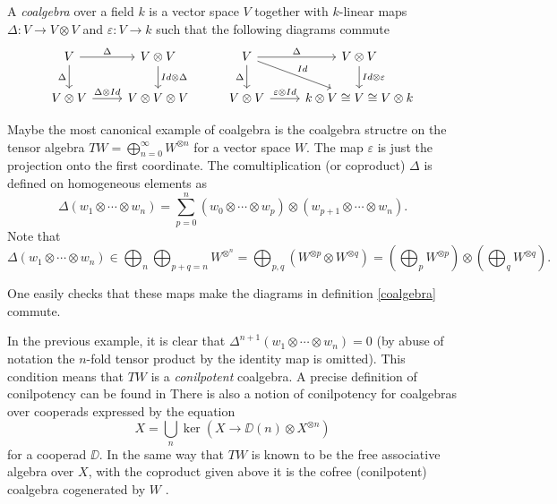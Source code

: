 \documentclass[TFM.tex]{subfiles}
\begin{document}
\begin{defi}\label{coalgebra}
A \emph{coalgebra} over a field $k$ is a vector space $V$ together with $k$-linear maps $\Delta:V\to V\otimes V$ and $\varepsilon:V\to k$ such that the following diagrams commute
\[
\begin{tikzcd}
V \arrow[r, "\Delta"] \arrow[d, "\Delta"'] & V\otimes V \arrow[d, "Id\otimes\Delta"] & V \arrow[r, "\Delta"] \arrow[d, "\Delta"'] \arrow[rd, "Id"] & V\otimes V \arrow[d, "Id\otimes\varepsilon"] \\
V\otimes V \arrow[r, "\Delta\otimes Id"]   & V\otimes V\otimes V                     & V\otimes V \arrow[r, "\varepsilon\otimes Id"]               & k\otimes V\cong V\cong V\otimes k           
\end{tikzcd}
\]
\end{defi}

\begin{ex}\label{cofree}
Maybe the most canonical example of coalgebra is the coalgebra structre on the tensor algebra $TW=\bigoplus_{n=0}^\infty W^{\otimes n}$ for a vector space $W$. The map $\varepsilon$ is just the projection onto the first coordinate. The comultiplication (or coproduct) $\Delta$ is defined on homogeneous elements as
\[
\Delta(w_1\otimes\cdots\otimes w_n)=\sum_{p=0}^n(w_0\otimes\cdots \otimes w_p)\otimes (w_{p+1}\otimes\cdots\otimes w_n).
\]
Note that $$\Delta(w_1\otimes\cdots\otimes w_n)\in\bigoplus_n\bigoplus_{p+q=n}W^{\otimes^n}=\bigoplus_{p,q}\left(W^{\otimes p}\otimes W^{\otimes q}\right)=\left(\bigoplus_p W^{\otimes p}\right)\otimes \left(\bigoplus_q W^{\otimes q}\right).$$ 

One easily checks that these maps make the diagrams in definition \ref{coalgebra} commute.
\end{ex}

In the previous example, it is clear that $\Delta^{n+1}(w_1\otimes\cdots\otimes w_n)=0$ (by abuse of notation the $n$-fold tensor product by the identity map is omitted). This condition means that $TW$ is a \emph{conilpotent} coalgebra. A precise definition of conilpotency can be found in \cite[.4]{AlgebraicOperads} There is also a notion of conilpotency for coalgebras over cooperads expressed by the equation
\[
X=\bigcup_n\ker(X\to \DD(n)\otimes X^{\otimes n})
\]
for a cooperad $\DD$. In the same way that $TW$ is known to be the free associative algebra over $X$, with the coproduct given above it is the cofree (conilpotent) coalgebra cogenerated by $W$ \cite[Proposition 2.1 of .6]{AlgebraicOperads}.
\end{document}
